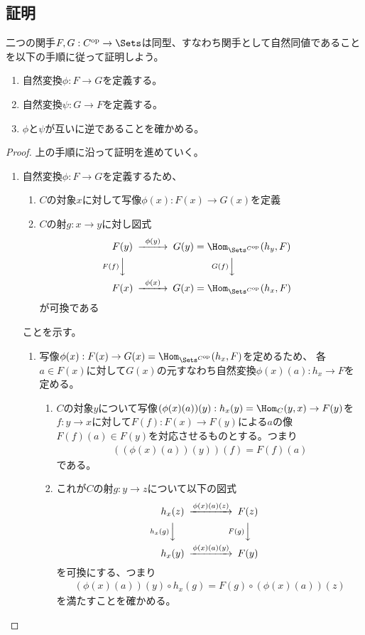 \documentclass[uplatex]{jsarticle}
\begin{document}
\subsection{証明}

二つの関手$F,G:C^{\rm op} \to \Sets$は同型、すなわち関手として自然同値であることを以下の手順に従って証明しよう。
\begin{enumerate}
\item 自然変換$\phi:F \to G$を定義する。
\item 自然変換$\psi:G \to F$を定義する。
\item $\phi$と$\psi$が互いに逆であることを確かめる。
\end{enumerate}

\begin{proof}
上の手順に沿って証明を進めていく。
\begin{enumerate}
\item 自然変換$\phi:F\to G$を定義するため、
\begin{enumerate}
\item $C$の対象$x$に対して写像$\phi(x):F(x) \to G(x)$を定義
\item $C$の射$g:x\to y$に対し図式
\begin{align*}
\begin{CD}
F(y)@>\phi(y)>>G(y)=\Hom_{\Sets^{C^{\rm op}}}(h_y,F)\\
@VF(f)VV@VG(f)VV\\
F(x)@>\phi(x)>>G(x)=\Hom_{\Sets^{C^{\rm op}}}(h_x,F)
\end{CD}
\end{align*}
が可換である
\end{enumerate}
ことを示す。
\begin{enumerate}
\item 写像$\phi(x):F(x)\to G(x)=\Hom_{\Sets^{C^{\rm op}}}(h_x,F)$を定めるため、
各$a\in F(x)$に対して$G(x)$の元すなわち自然変換$\phi(x)(a):h_x\to F$を定める。
\begin{enumerate}
\item $C$の対象$y$について写像$(\phi(x)(a))(y):h_x(y)=\Hom_C(y,x)\to F(y)$を$f:y\to x$に対して$F(f):F(x)\to F(y)$による$a$の像$F(f)(a)\in F(y)$を対応させるものとする。つまり
\begin{align}\label{phi_def}
((\phi(x)(a))(y))(f)=F(f)(a)
\end{align}
である。
\item これが$C$の射$g:y\to z$について以下の図式
\begin{align}\label{phixa}
\begin{CD}
h_x(z)@>\phi(x)(a)(z)>>F(z)\\
@Vh_x(g)VV@VF(g)VV\\
h_x(y)@>\phi(x)(a)(y)>>F(y)
\end{CD}
\end{align}
を可換にする、つまり
\begin{align}\label{phixa_comm}
(\phi(x)(a))(y)\circ h_x(g)=F(g)\circ(\phi(x)(a))(z)
\end{align}
を満たすことを確かめる。


\end{enumerate}
\end{enumerate}
\end{enumerate}
\end{proof}
\end{document}
